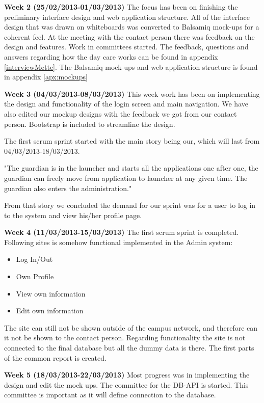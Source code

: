 \textbf{Week 2 (25/02/2013-01/03/2013)}
The focus has been on finishing the preliminary interface design and web application structure.
All of the interface design that was drawn on whiteboards was converted to Balsamiq mock-ups for a coherent feel.
At the meeting with the contact person there was feedback on the design and features. 
Work in committees started. 
The feedback, questions and answers regarding how the day care works can be found in appendix \vref{interviewMette}.
The Balsamiq mock-ups and web application structure is found in appendix \vref{apx:mockups} 

\textbf{Week 3 (04/03/2013-08/03/2013)}
This week work has been on implementing the design and functionality of the login screen and main navigation.  
We have also edited our mockup designs with the feedback we got from our contact person. 
Bootstrap is included to streamline the design. 

The first scrum sprint started with the main story being  our, which will last from 04/03/2013-18/03/2013. 

"The guardian is in the launcher and starts all the applications one after one, the guardian can freely move from application to launcher at any given time.
The guardian also enters the administration."

From that story we concluded the demand for our sprint was for a user to log in to the system and view his/her profile page. 

\textbf{Week 4 (11/03/2013-15/03/2013) }
The first scrum sprint is completed. 
Following sites is somehow functional implemented in the Admin system:
\begin{itemize}
        \item Log In/Out
        \item Own Profile
        \item View own information
        \item Edit own information
\end{itemize}
The site can still not be shown outside of the campus network, and therefore can it not be shown to the contact person.
Regarding functionality the site is not connected to the final database but all the dummy data is there.  
The first parts of the common report is created.

\textbf{Week 5 (18/03/2013-22/03/2013)}
Most progress was in implementing the design and edit the mock ups. The committee for the DB-API is started. This committee is important as it will define connection to the database. 

